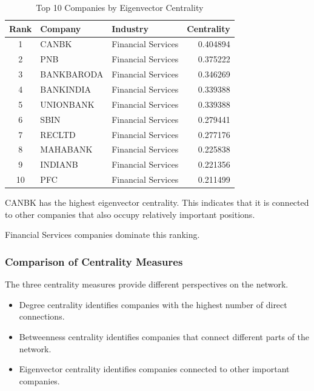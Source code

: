 \documentclass[11pt,a4paper]{article}
\begin{document}
\begin{table}[H]
\centering
\caption{Top 10 Companies by Eigenvector Centrality}
\label{tab:eigenvector}
\small
\begin{tabular}{cllr}
\toprule
\textbf{Rank} & \textbf{Company} & \textbf{Industry} &
\textbf{Centrality}\\
\midrule
1 & CANBK & Financial Services & 0.404894\\
2 & PNB & Financial Services & 0.375222\\
3 & BANKBARODA & Financial Services & 0.346269\\
4 & BANKINDIA & Financial Services & 0.339388\\
5 & UNIONBANK & Financial Services & 0.339388\\
6 & SBIN & Financial Services & 0.279441\\
7 & RECLTD & Financial Services & 0.277176\\
8 & MAHABANK & Financial Services & 0.225838\\
9 & INDIANB & Financial Services & 0.221356\\
10 & PFC & Financial Services & 0.211499\\
\bottomrule
\end{tabular}
\end{table}

CANBK has the highest eigenvector centrality.
This indicates that it is connected to other companies
that also occupy relatively important positions.

Financial Services companies dominate this ranking.

\subsubsection{Comparison of Centrality Measures}

The three centrality measures provide different
perspectives on the network.

\begin{itemize}
    \item Degree centrality identifies companies with
    the highest number of direct connections.

    \item Betweenness centrality identifies companies
    that connect different parts of the network.

    \item Eigenvector centrality identifies companies
    connected to other important companies.
\end{itemize}
\end{document}
